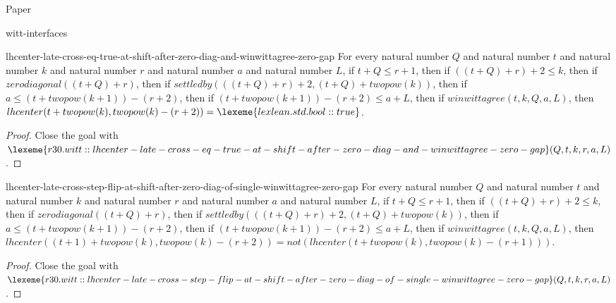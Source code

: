 \begin{lexlean}{Paper}
\begin{section}{witt-interfaces}
  \begin{theorem}{lhcenter-late-cross-eq-true-at-shift-after-zero-diag-and-winwittagree-zero-gap}
  For every natural number \(Q\) and natural number \(t\) and natural number \(k\) and natural number \(r\) and natural number \(a\) and natural number \(L\), if \(t + Q ≤ r + 1\), then if \(((t + Q) + r) + 2 ≤ k\), then if \(zerodiagonal((t + Q) + r)\), then if \(settledby(((t + Q) + r) + 2, (t + Q) + twopow(k))\), then if \(a ≤ (t + twopow(k + 1)) - (r + 2)\), then if \((t + twopow(k + 1)) - (r + 2) ≤ a + L\), then if \(winwittagree(t, k, Q, a, L)\), then \(lhcenter(t + twopow(k), twopow(k) - (r + 2)) = \lexeme{lexlean.std.bool::true}\).
  \begin{proof}
  Close the goal with \(\lexeme{r30.witt::lhcenter-late-cross-eq-true-at-shift-after-zero-diag-and-winwittagree-zero-gap}(Q, t, k, r, a, L)\).
  \end{proof}
  \end{theorem}

  \begin{theorem}{lhcenter-late-cross-step-flip-at-shift-after-zero-diag-of-single-winwittagree-zero-gap}
  For every natural number \(Q\) and natural number \(t\) and natural number \(k\) and natural number \(r\) and natural number \(a\) and natural number \(L\), if \(t + Q ≤ r + 1\), then if \(((t + Q) + r) + 2 ≤ k\), then if \(zerodiagonal((t + Q) + r)\), then if \(settledby(((t + Q) + r) + 2, (t + Q) + twopow(k))\), then if \(a ≤ (t + twopow(k + 1)) - (r + 2)\), then if \((t + twopow(k + 1)) - (r + 2) ≤ a + L\), then if \(winwittagree(t, k, Q, a, L)\), then \(lhcenter((t + 1) + twopow(k), twopow(k) - (r + 2)) = not(lhcenter(t + twopow(k), twopow(k) - (r + 1)))\).
  \begin{proof}
  Close the goal with \(\lexeme{r30.witt::lhcenter-late-cross-step-flip-at-shift-after-zero-diag-of-single-winwittagree-zero-gap}(Q, t, k, r, a, L)\).
  \end{proof}
  \end{theorem}


\end{section}
\end{lexlean}

